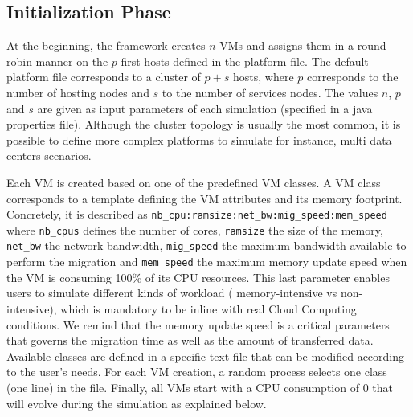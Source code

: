 \documentclass[conference]{IEEEtran}
\begin{document}

\subsection{Initialization Phase}
At the beginning, the framework creates $n$ VMs and assigns them in a
round-robin manner on the $p$ first hosts defined in the platform file.
The default platform file corresponds to a cluster of $p+s$ hosts,
where $p$ corresponds to the number of hosting nodes and $s$ to the
number of services nodes. The values $n$, $p$ and $s$ are given as input
parameters of each simulation (specified in a java properties file). Although the cluster topology is usually the
most common, it is possible to define more complex platforms to simulate for
instance, multi data centers scenarios.

Each VM is created based on one of the predefined VM classes. A VM class
corresponds to a template defining the VM attributes and its memory
footprint. Concretely, it is described as
\texttt{nb\_cpu:ramsize:net\_bw:mig\_speed:mem\_speed} where
\texttt{nb\_cpus} defines the number of cores, \texttt{ramsize} the
size of the memory, \texttt{net\_bw} the network bandwidth,
\texttt{mig\_speed} the maximum bandwidth available to perform the
migration and \texttt{mem\_speed} the maximum memory update speed when
the VM is consuming 100\% of its CPU resources. This last parameter
enables users to simulate different kinds of workload (\ie
memory-intensive vs non-intensive), which is mandatory to be inline
with real Cloud Computing conditions. We remind that the memory update
speed is a critical parameters that governs the migration time as well
as the amount of transferred data. Available classes are defined in
a specific text file that can be modified according to the user's needs.
For each VM creation, a random process selects one class (\ie one line) in the file.
Finally, all VMs start with a CPU consumption of 0 that will evolve during the simulation as
explained below.
\end{document}
